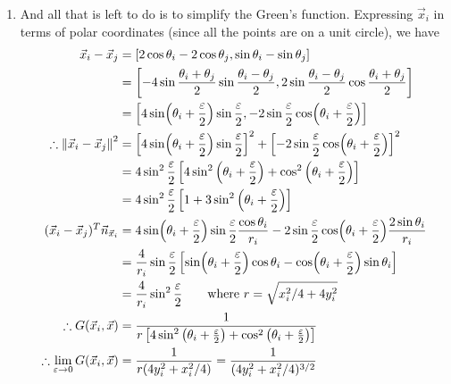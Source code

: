 \begin{enumerate}[label=(\alph*),leftmargin=*,itemsep=0mm]
    \item And all that is left to do is to simplify the Green's function.  Expressing $\vec{x}_i$ in terms of polar coordinates (since all the points are on a unit circle), we have
    \begin{align*}
        \vec{x}_i-\vec{x}_j &= [2\cos\theta_i - 2\cos\theta_j, \sin\theta_i-\sin\theta_j] \\
        &= \left[ -4\sin\frac{\theta_i+\theta_j}{2}\sin\frac{\theta_i-\theta_j}{2},
        2\sin\frac{\theta_i-\theta_j}{2}\cos\frac{\theta_i+\theta_j}{2} \right] \\
        &= \left[ 4\sin(\theta_i+\frac{\varepsilon}{2})\sin\frac{\varepsilon}{2},
        -2\sin\frac{\varepsilon}{2}\cos(\theta_i+\frac{\varepsilon}{2}) \right] \\
        \therefore \norm{\vec{x}_i-\vec{x}_j}^2
        &= \left[ 4\sin(\theta_i+\frac{\varepsilon}{2})\sin\frac{\varepsilon}{2} \right]^2
        + \left[ -2\sin\frac{\varepsilon}{2}\cos(\theta_i+\frac{\varepsilon}{2}) \right]^2 \\
        &= 4\sin^2\frac{\varepsilon}{2}
        \left[ 4\sin^2\left(\theta_i+\frac{\varepsilon}{2}\right)
        + \cos^2\left(\theta_i+\frac{\varepsilon}{2}\right) \right] \\
        &= 4\sin^2\frac{\varepsilon}{2}
        \left[ 1 + 3 \sin^2\left(\theta_i+\frac{\varepsilon}{2}\right) \right]\\
        (\vec{x}_i-\vec{x}_j)^T \vec{n}_{\vec{x}_i}
        &= 4\sin(\theta_i+\frac{\varepsilon}{2})\sin\frac{\varepsilon}{2}\frac{\cos\theta_i}{r_i}
        - 2\sin\frac{\varepsilon}{2}\cos(\theta_i+\frac{\varepsilon}{2})\frac{2\sin\theta_i}{r_i} \\
        &= \frac{4}{r_i}\sin\frac{\varepsilon}{2} \left[ \sin(\theta_i+\frac{\varepsilon}{2})\cos\theta_i
        - \cos(\theta_i+\frac{\varepsilon}{2})\sin\theta_i\right] \\
        &= \frac{4}{r_i}\sin^2\frac{\varepsilon}{2} \qquad \text{where $r = \sqrt{x_i^2/4+4y_i^2}$}\\
        \therefore G(\vec{x}_i,\vec{x})
        &= \frac{1}{r\left[ 4\sin^2\left(\theta_i+\frac{\varepsilon}{2}\right)
        + \cos^2\left(\theta_i+\frac{\varepsilon}{2}\right) \right] } \\
        \therefore \lim_{\varepsilon\rightarrow0} G(\vec{x}_i,\vec{x})
        &= \frac{1}{r(4y_i^2+x_i^2/4)} = \frac{1}{(4y_i^2+x_i^2/4)^{3/2}}
    \end{align*}
    
\end{enumerate}